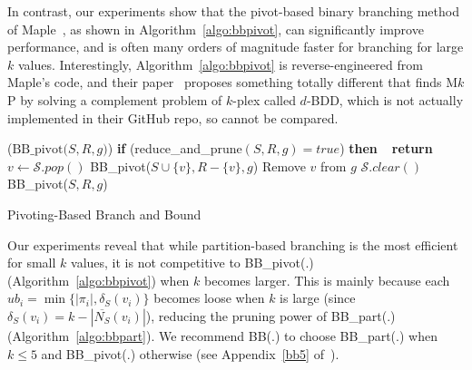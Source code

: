 \documentclass[sigconf, nonacm]{acmart}
\begin{document}
In contrast, our experiments show that the pivot-based binary branching method of Maple~\cite{Maple}, as shown in Algorithm~\ref{algo:bbpivot}, can significantly improve performance, and is often many orders of magnitude faster for branching for large $k$ values. Interestingly, Algorithm~\ref{algo:bbpivot} is reverse-engineered from Maple's code, and their paper~\cite{Maple} proposes something totally different that finds M$k$P by solving a complement problem of $k$-plex called $d$-BDD, which is not actually implemented in their GitHub repo, so cannot be compared.

\begin{algorithm}[!t]
  \DontPrintSemicolon
  \Begin($\text{BB\_pivot}{(}S, R, g{)}$){
    {\bf if} (reduce\_and\_prune$(S, R, g)=\textit{true}$) {\bf then\ \ return}\;
      $v\gets \mathcal{S}.pop()$\;
      BB\_pivot($S\cup \{v\}, R-\{v\}, g$)\;\label{bbpivot:rec1} %
      Remove $v$ from $g$\; \label{bbpivot:remove-v} %
      $\mathcal{S}.clear()$\;
      BB\_pivot($S, R, g$)\;\label{bbpivot:rec2} %
  }
\caption{Pivoting-Based Branch and Bound}    
\label{algo:bbpivot}
\end{algorithm}


Our experiments reveal that while partition-based branching is the most efficient for small $k$ values, it is not competitive to BB\_pivot(.) (Algorithm~\ref{algo:bbpivot}) when $k$ becomes larger. This is mainly because each $ub_i=\min\{|\pi_i|, \delta_S(v_i)\}$ becomes loose when $k$ is large (since $\delta_S(v_i)=k-|\overline{N_S}(v_i)|$), reducing the pruning power of BB\_part(.) (Algorithm~\ref{algo:bbpart}). We recommend BB(.) to choose BB\_part(.) when $k\leq 5$ and BB\_pivot(.) otherwise (see Appendix~\ref{bb5} of~\cite{tech_report}).
\end{document}
